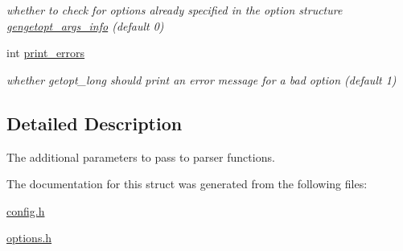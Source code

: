 \begin{DoxyCompactItemize}
\begin{DoxyCompactList}\small\item\em whether to check for options already specified in the option structure \hyperlink{structgengetopt__args__info}{gengetopt\+\_\+args\+\_\+info} (default 0) \end{DoxyCompactList}\item 
\hypertarget{structcmdline__parser__params_a3236f066777488e8502abe05ccd24455}{}int \hyperlink{structcmdline__parser__params_a3236f066777488e8502abe05ccd24455}{print\+\_\+errors}\label{structcmdline__parser__params_a3236f066777488e8502abe05ccd24455}

\begin{DoxyCompactList}\small\item\em whether getopt\+\_\+long should print an error message for a bad option (default 1) \end{DoxyCompactList}\end{DoxyCompactItemize}


\subsection{Detailed Description}
The additional parameters to pass to parser functions. 

The documentation for this struct was generated from the following files\+:\begin{DoxyCompactItemize}
\item 
\hyperlink{config_8h}{config.\+h}\item 
\hyperlink{options_8h}{options.\+h}\end{DoxyCompactItemize}
